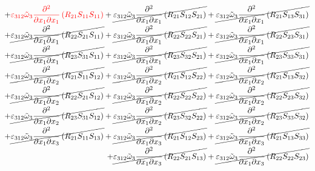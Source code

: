\begin{equation}
	\begin{split}
		+{\color{red}\varepsilon_{312}\tilde{\omega}_{3}\pdv{}{x_{1}}{x_{1}}\left(R_{21}S_{11}S_{11}\right)}
		+\cancel{\varepsilon_{312}\tilde{\omega}_{3}\pdv{}{x_{1}}{x_{1}}\left(R_{21}S_{12}S_{21}\right)}
		+\cancel{\varepsilon_{312}\tilde{\omega}_{3}\pdv{}{x_{1}}{x_{1}}\left(R_{21}S_{13}S_{31}\right)}\\
		+\cancel{\varepsilon_{312}\tilde{\omega}_{3}\pdv{}{x_{1}}{x_{1}}\left(R_{22}S_{21}S_{11}\right)}
		+\cancel{\varepsilon_{312}\tilde{\omega}_{3}\pdv{}{x_{1}}{x_{1}}\left(R_{22}S_{22}S_{21}\right)}
		+\cancel{\varepsilon_{312}\tilde{\omega}_{3}\pdv{}{x_{1}}{x_{1}}\left(R_{22}S_{23}S_{31}\right)}\\
		+\cancel{\varepsilon_{312}\tilde{\omega}_{3}\pdv{}{x_{1}}{x_{1}}\left(R_{23}S_{31}S_{11}\right)}
		+\cancel{\varepsilon_{312}\tilde{\omega}_{3}\pdv{}{x_{1}}{x_{1}}\left(R_{23}S_{32}S_{21}\right)}
		+\cancel{\varepsilon_{312}\tilde{\omega}_{3}\pdv{}{x_{1}}{x_{1}}\left(R_{23}S_{33}S_{31}\right)}\\
		+\cancel{\varepsilon_{312}\tilde{\omega}_{3}\pdv{}{x_{1}}{x_{2}}\left(R_{21}S_{11}S_{12}\right)}
		+\cancel{\varepsilon_{312}\tilde{\omega}_{3}\pdv{}{x_{1}}{x_{2}}\left(R_{21}S_{12}S_{22}\right)}
		+\cancel{\varepsilon_{312}\tilde{\omega}_{3}\pdv{}{x_{1}}{x_{2}}\left(R_{21}S_{13}S_{32}\right)}\\
		+\cancel{\varepsilon_{312}\tilde{\omega}_{3}\pdv{}{x_{1}}{x_{2}}\left(R_{22}S_{21}S_{12}\right)}
		+\cancel{\varepsilon_{312}\tilde{\omega}_{3}\pdv{}{x_{1}}{x_{2}}\left(R_{22}S_{22}S_{22}\right)}
		+\cancel{\varepsilon_{312}\tilde{\omega}_{3}\pdv{}{x_{1}}{x_{2}}\left(R_{22}S_{23}S_{32}\right)}\\
		+\cancel{\varepsilon_{312}\tilde{\omega}_{3}\pdv{}{x_{1}}{x_{2}}\left(R_{23}S_{31}S_{12}\right)}
		+\cancel{\varepsilon_{312}\tilde{\omega}_{3}\pdv{}{x_{1}}{x_{2}}\left(R_{23}S_{32}S_{22}\right)}
		+\cancel{\varepsilon_{312}\tilde{\omega}_{3}\pdv{}{x_{1}}{x_{2}}\left(R_{23}S_{33}S_{32}\right)}\\
		+\cancel{\varepsilon_{312}\tilde{\omega}_{3}\pdv{}{x_{1}}{x_{3}}\left(R_{21}S_{11}S_{13}\right)}
		+\cancel{\varepsilon_{312}\tilde{\omega}_{3}\pdv{}{x_{1}}{x_{3}}\left(R_{21}S_{12}S_{23}\right)}
		+\cancel{\varepsilon_{312}\tilde{\omega}_{3}\pdv{}{x_{1}}{x_{3}}\left(R_{21}S_{13}S_{33}\right)}\\
		+\cancel{\varepsilon_{312}\tilde{\omega}_{3}\pdv{}{x_{1}}{x_{3}}\left(R_{22}S_{21}S_{13}\right)}
		+\cancel{\varepsilon_{312}\tilde{\omega}_{3}\pdv{}{x_{1}}{x_{3}}\left(R_{22}S_{22}S_{23}\right)}

\end{split}
\end{equation}

